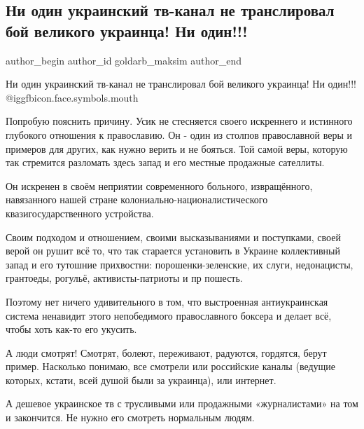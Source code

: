  
 
 
 
 
 
\subsection{Ни один украинский тв-канал не транслировал бой великого украинца! Ни один!!!}
\label{sec:26_09_2021.fb.goldarb_maksim.1.usik_boj_ukrtv}
 
\ifcmt
 author_begin
   author_id goldarb_maksim
 author_end
\fi

Ни один украинский тв-канал не транслировал бой великого украинца! Ни один!!!
 @igg{fbicon.face.symbols.mouth} 

Попробую пояснить причину. Усик не стесняется своего искреннего и истинного
глубокого отношения к православию. Он - один из столпов православной веры и
примеров для других, как нужно верить и не бояться. Той самой веры, которую так
стремится разломать здесь запад и его местные продажные сателлиты. 

Он искренен в своём неприятии современного больного, извращённого, навязанного
нашей стране колониально-националистического квазигосударственного устройства. 

Своим подходом и отношением, своими высказываниями и поступками, своей верой он
рушит всё то, что так старается установить в Украине коллективный запад и его
тутошние прихвостни: порошенки-зеленские, их слуги, недонацисты, грантоеды,
рогульё, активисты-патриоты и пр пошесть.

Поэтому нет ничего удивительного в том, что  выстроенная антиукраинская система
ненавидит этого непобедимого православного боксера и делает всё, чтобы хоть
как-то его укусить. 

А люди смотрят! Смотрят, болеют, переживают, радуются, гордятся, берут пример.
Насколько понимаю, все смотрели или российские каналы (ведущие которых, кстати,
всей душой были за украинца), или интернет.

А дешевое украинское тв с трусливыми или продажными «журналистами» на том и
закончится. Не нужно его смотреть нормальным людям.

